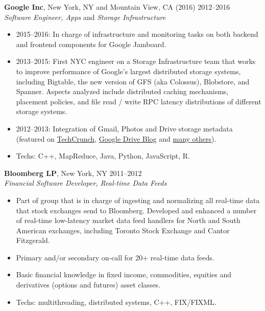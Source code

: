 \documentclass[line,margin]{res}
\begin{document}
\begin{resume}
  \textbf{Google Inc}, New York, NY and Mountain View, CA (2016) \hfill 2012--2016 \\
  {\sl Software Engineer, Apps} and {\sl Storage Infrastructure}
  \begin{itemize}  \itemsep -2pt
  \item  2015--2016: In charge of infrastructure and monitoring tasks on both backend and frontend components for Google Jamboard.
  \item  2013--2015: First NYC engineer on a Storage Infrastructure team that works to improve
  performance of Google's largest distributed storage systems, including Bigtable, the new
  version of GFS (aka Colossus), Blobstore, and Spanner.  Aspects analyzed include
  distributed caching mechanisms, placement policies, and file read / write RPC latency
  distributions of different storage systems.
  \item 2012--2013: Integration of Gmail, Photos and Drive storage metadata (featured on
  \href{http://goo.gl/y8cpvZ}{TechCrunch}, \href{http://googledrive.blogspot.com/2013/05/bringing-it-all-together-15-gb-now.html}{Google Drive Blog}
  and \href{https://www.google.com/search?q=google\%20unifies\%20drive\%20gmail\%20google\%20photos\%2015gb}{many others}).
  \item Techs: C++, MapReduce, Java, Python, JavaScript, R.
  \end{itemize}

  \textbf{Bloomberg LP}, New York, NY \hfill 2011--2012 \\
  {\sl Financial Software Developer, Real-time Data Feeds}
  \begin{itemize}  \itemsep -2pt
  \item Part of group that is in charge of ingesting and normalizing all real-time data that stock exchanges send to Bloomberg.  Developed and enhanced a number of real-time low-latency market data feed handlers for North and South American exchanges, including Toronto Stock Exchange and Cantor Fitzgerald.
  \item Primary and/or secondary on-call for 20+ real-time data feeds.
  \item Basic financial knowledge in fixed income, commodities, equities and derivatives (options and futures) asset classes.
  \item Techs: multithreading, distributed systems, C++, FIX/FIXML.
  \end{itemize}


\end{resume}
\end{document}
